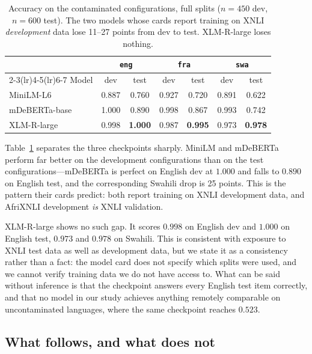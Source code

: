 \documentclass[11pt]{article}
\newcommand{\claim}[1]{#1}   %
\begin{document}
\begin{table}[t]
\centering
\small
\begin{tabular}{lcccccc}
\toprule
& \multicolumn{2}{c}{\texttt{eng}} & \multicolumn{2}{c}{\texttt{fra}}
& \multicolumn{2}{c}{\texttt{swa}} \\
\cmidrule(lr){2-3}\cmidrule(lr){4-5}\cmidrule(lr){6-7}
Model & dev & test & dev & test & dev & test \\
\midrule
MiniLM-L6     & 0.887 & 0.760 & 0.927 & 0.720 & 0.891 & 0.622 \\
mDeBERTa-base & 1.000 & 0.890 & 0.998 & 0.867 & 0.993 & 0.742 \\
XLM-R-large   & 0.998 & \textbf{1.000} & 0.987 & \textbf{0.995} & 0.973 & \textbf{0.978} \\
\bottomrule
\end{tabular}
\caption{Accuracy on the contaminated configurations, full splits
($n=450$ dev, $n=600$ test). The two models whose cards report training on XNLI
\emph{development} data lose 11--27 points from dev to test. XLM-R-large loses
nothing.}
\label{tab:devtest}
\end{table}

Table~\ref{tab:devtest} separates the three checkpoints sharply. MiniLM and
mDeBERTa perform far better on the development configurations than on the test
configurations---mDeBERTa is perfect on English dev at $1.000$ and falls to
$0.890$ on English test, and the corresponding Swahili drop is 25 points. This is
the pattern their cards predict: both report training on XNLI development data,
and AfriXNLI development \emph{is} XNLI validation.

XLM-R-large shows no such gap. It scores $0.998$ on English dev and $1.000$ on
English test, $0.973$ and $0.978$ on Swahili. \claim{This is consistent with
exposure to XNLI test data as well as development data}, but we state it as a
consistency rather than a fact: the model card does not specify which splits were
used, and we cannot verify training data we do not have access to. What can be
said without inference is that the checkpoint answers every English test item
correctly, and that no model in our study achieves anything remotely comparable
on uncontaminated languages, where the same checkpoint reaches $0.523$.

\subsection{What follows, and what does not}
\end{document}
